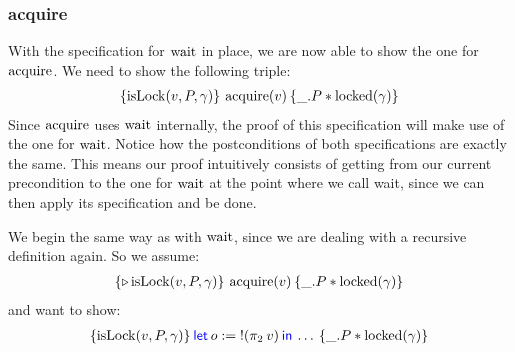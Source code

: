 \subsubsection{acquire}
With the specification for $\operatorname{wait}$ in place, we are now able to show the one for $\operatorname{acquire}$. We need to show the following triple:
\begin{align*}
  \hoare{\isLock(v, P, \gamma)}{\acquire (v)}{\_.P \ast \locked(\gamma)}
\end{align*}
Since $\operatorname{acquire}$ uses $\operatorname{wait}$ internally, the proof of this specification will make use of the one for $\operatorname{wait}$. Notice how the postconditions of both specifications are exactly the same. This means our proof intuitively consists of getting from our current precondition to the one for $\operatorname{wait}$ at the point where we call wait, since we can then apply its specification and be done.

We begin the same way as with $\operatorname{wait}$, since we are dealing with a recursive definition again. So we assume:
\begin{align*}
  \hoare{\later \isLock(v, P, \gamma)}{\acquire (v)}{\_.P \ast \locked(\gamma)}
\end{align*}
and want to show:
\begin{align*}
  \hoare{\isLock(v, P, \gamma)}{\Let o = \deref (\Proj{2} v) in \dots}{\_.P \ast \locked(\gamma)}
\end{align*}

